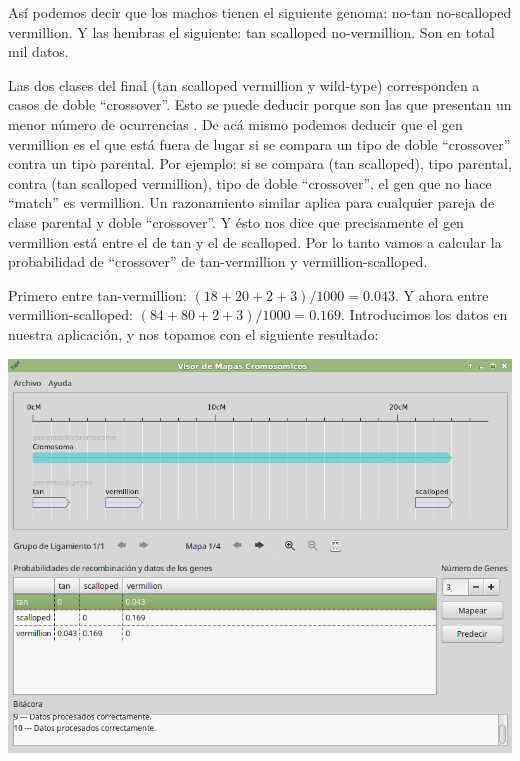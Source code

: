\documentclass{article}
\begin{document}
	Así podemos decir que los machos tienen el siguiente genoma: no-tan no-scalloped vermillion. Y las hembras el siguiente: tan scalloped no-vermillion. Son en total mil datos.
	                                                     
	Las dos clases del final (tan scalloped vermillion y wild-type) corresponden a casos de doble ``crossover''. Esto se puede deducir porque son las que presentan un menor número de ocurrencias  \cite{carrinnes2003handbook}. De acá mismo podemos deducir que el gen vermillion es el que está fuera de lugar si se compara un tipo de doble ``crossover'' contra un tipo parental. Por ejemplo: si se compara (tan scalloped), tipo parental, contra (tan scalloped vermillion), tipo de doble ``crossover'', el gen que no hace ``match'' es vermillion. Un razonamiento similar aplica para cualquier pareja de clase parental y doble ``crossover''. Y ésto nos dice que precisamente el gen vermillion está entre el de tan y el de scalloped. Por lo tanto vamos a calcular la probabilidad de ``crossover'' de tan-vermillion y vermillion-scalloped.
	
	Primero entre tan-vermillion: $(18 + 20 + 2 + 3) / 1000 = 0.043$. Y ahora entre vermillion-scalloped: $(84 + 80 + 2 + 3) / 1000 = 0.169$. Introducimos los datos en nuestra aplicación, y nos topamos con el siguiente resultado:
	
	\begin{center}
		\includegraphics[scale=0.5]{images/e_6.png}
	\end{center}
	
\end{document}
